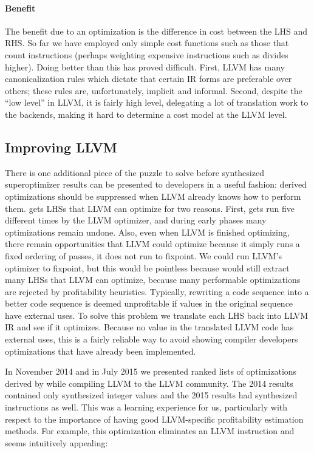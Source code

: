 \paragraph{Benefit}
%
The benefit due to an optimization is the difference in cost between
the LHS and RHS\@.
%
So far we have employed only simple cost functions such as those that
count instructions (perhaps weighting expensive instructions such as
divides higher).
%
Doing better than this has proved difficult.
%
First, LLVM has many canonicalization rules which dictate that certain
IR forms are preferable over others; these rules are, unfortunately,
implicit and informal.
%
Second, despite the ``low level'' in LLVM, it is fairly high level,
delegating a lot of translation work to the backends, making it hard
to determine a cost model at the LLVM level.


\subsection{Improving LLVM}

There is one additional piece of the puzzle to solve before
synthesized superoptimizer results can be presented to developers in a
useful fashion: derived optimizations should be suppressed when LLVM
already knows how to perform them.
%
\tool{} gets LHSs that LLVM can optimize for two reasons.
%
First, \tool{} gets run five different times by the LLVM optimizer,
and during early phases many optimizations remain undone.
%
Also, even when LLVM is finished optimizing, there remain opportunities
that LLVM could optimize because it simply runs a fixed ordering of
passes, it does not run to fixpoint.
%
We could run LLVM's optimizer to fixpoint, but this would be pointless
because \tool{} would still extract many LHSs that LLVM can optimize,
because many performable optimizations are rejected by profitability
heuristics.
%
Typically, rewriting a code sequence into a better code sequence is
deemed unprofitable if values in the original sequence have external uses.
%
To solve this problem we translate each \tool{} LHS back into LLVM IR
and see if it optimizes.
%
Because no value in the translated LLVM code has external uses, this
is a fairly reliable way to avoid showing compiler developers
optimizations that have already been implemented.


In November 2014 and in July 2015 we presented ranked lists of
optimizations derived by \tool{} while compiling LLVM to the LLVM
community.
%
The 2014 results contained only synthesized integer values and the
2015 results had synthesized instructions as well.
%
This was a learning experience for us, particularly with respect to
the importance of having good LLVM-specific profitability estimation
methods.
%
For example, this optimization eliminates an LLVM instruction and
seems intuitively appealing:

